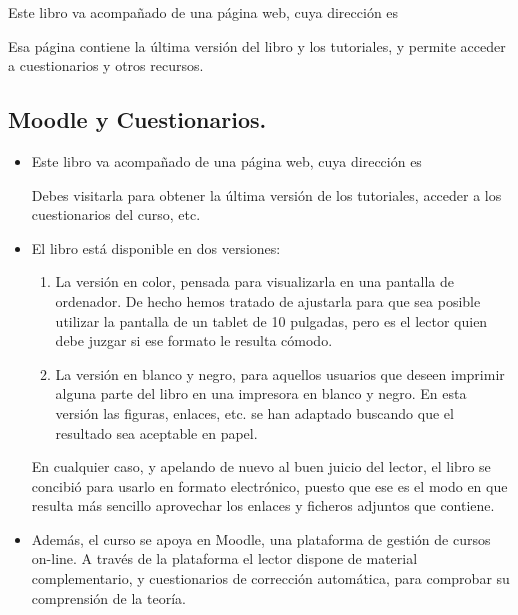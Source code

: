 Este libro va acompañado de una página web, cuya dirección es
            \begin{center}
            \end{center}
Esa página contiene la última versión del libro y los tutoriales, y permite acceder a cuestionarios y otros recursos.

\subsection*{Moodle y Cuestionarios.}
\label{prefacio:subsec:Tutoriales}


\begin{itemize}
    \item Este libro va acompañado de una página web, cuya dirección es
            \begin{center}
            \end{center}
        Debes visitarla para obtener la última versión de los tutoriales, acceder a los
    cuestionarios del curso, etc.
    \item El libro está disponible en dos versiones:
        \begin{enumerate}
          \item La versión en color, pensada para visualizarla en una pantalla de ordenador. De hecho hemos tratado de ajustarla para que sea posible utilizar la pantalla de un tablet de 10 pulgadas, pero es el lector quien debe juzgar si ese formato le resulta cómodo.

          \item La versión en blanco y negro, para aquellos usuarios que deseen imprimir alguna parte del libro en una impresora en blanco y negro.  En esta versión las figuras, enlaces, etc. se han adaptado buscando que el resultado sea aceptable en papel.
        \end{enumerate}
        En cualquier caso, y apelando de nuevo al buen juicio del lector, el libro se concibió para usarlo en formato electrónico, puesto que ese es el modo en que resulta más sencillo aprovechar los enlaces y ficheros adjuntos que contiene.

    \item Además, el curso se apoya en Moodle, una plataforma de gestión de cursos on-line. A
        través de la plataforma el lector dispone de material complementario, y cuestionarios de
        corrección automática, para comprobar su comprensión de la teoría.


\end{itemize}
